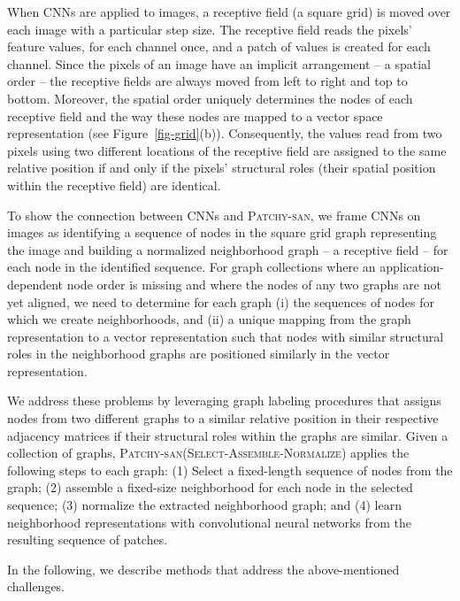 \documentclass{article}
\newcommand{\patchysan}{{\textsc{Patchy-san}}\xspace}
\begin{document}
When CNNs are applied to images, a receptive field (a square grid) is moved over each image with a particular step size. The receptive field reads the pixels' feature values,  for each channel once, and a patch of values is created for each channel. 
Since the pixels of an image have an implicit arrangement -- a spatial order -- the receptive fields are always moved from left to right and top to bottom. Moreover, the spatial order uniquely determines the nodes of each receptive field and the way these nodes are mapped to a vector space representation (see Figure~\ref{fig-grid}(b)). Consequently, the values read from two pixels using two different locations of the receptive field are assigned to the same relative position if and only if the pixels' structural roles (their spatial position within the receptive field) are identical.

To show the connection between CNNs and \patchysan, we frame CNNs on images as identifying a sequence of nodes in the square grid graph representing the image and building a normalized neighborhood graph -- a receptive field -- for each node in the identified sequence.
For graph collections where an application-dependent node order is missing and where the nodes of any two graphs are not yet aligned, we need to determine for each graph (i) the sequences of nodes for which we create neighborhoods, and (ii) a unique mapping from the graph representation to a vector representation such that nodes with similar structural roles in the neighborhood graphs are positioned similarly in the vector representation. 

We address these problems by leveraging graph labeling procedures that assigns nodes from two different graphs to a similar relative position in their respective adjacency matrices if their structural roles within the graphs are similar. Given a collection of graphs, \patchysan (\textsc{Select}-\textsc{Assemble}-\textsc{Normalize}) applies the following steps to each graph: (1) Select a fixed-length sequence of nodes from the graph; (2) assemble a fixed-size neighborhood for each node in the selected sequence; (3) normalize the extracted  neighborhood graph; and (4) learn neighborhood representations with convolutional neural networks from the resulting sequence of patches.  

In the following, we describe methods that address the above-mentioned challenges. 
\end{document}
